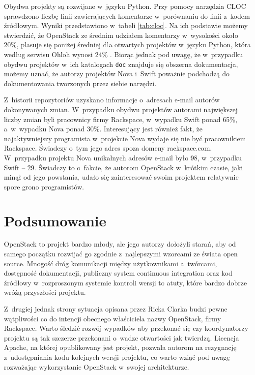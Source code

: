 	Obydwa projekty są rozwijane w~języku Python. Przy pomocy narzędzia CLOC
	\cite{cloc} sprawdzono liczbę linii zawierających komentarze w~porównaniu do
	linii z~kodem źródłowym. Wyniki przedstawiono w~tabeli \ref{tab:cloc}.
	Na ich podstawie możemy stwierdzić, że OpenStack ze średnim udziałem
	komentarzy w~wysokości około 20\%, plasuje się poniżej średniej dla
	otwartych projektów w~języku Python, która według serwisu Ohloh wynosi 24\%
	\cite{ohloh_python_stats}. Biorąc jednak pod uwagę, że w~przypadku obydwu
	projektów w~ich katalogach \texttt{doc} znajduje się obszerna dokumentacja,
	możemy uznać, że autorzy projektów Nova i~Swift poważnie podchodzą do
	dokumentowania tworzonych przez siebie narzędzi.

	Z~historii repozytoriów uzyskano informacje o~adresach e-mail autorów
	dokonywanych zmian. W~przypadku obydwu projektów autorami największej liczby
	zmian byli pracownicy firmy Rackspace, w~wypadku Swift ponad 65\%,
	a~w~wypadku Nova ponad 30\%. Interesujący jest również fakt, że
	najaktywniejszy programista w~projekcie Nova wydaje się nie być pracownikiem
	Rackspace. Świadczy o~tym jego adres spoza domeny rackspace.com.
	W~przypadku projektu Nova unikalnych adresów e-mail było 98, w~przypadku
	Swift -- 29. Świadczy to o~fakcie, że autorom OpenStack w~krótkim
	czasie, jaki minął od jego powstania, udało się zainteresować swoim
	projektem relatywnie spore grono programistów.

	\section{Podsumowanie}

	OpenStack to projekt bardzo młody, ale jego autorzy dołożyli starań, aby od
	samego początku rozwijać go zgodnie z~najlepszymi wzorcami ze świata open
	source. Mnogość dróg komunikacji między użytkownikami a~twórcami,
	dostępność dokumentacji, publiczny system continuous integration oraz kod
	źródłowy w~rozproszonym systemie kontroli wersji to atuty, które bardzo
	dobrze wróżą przyszłości projektu.

	Z~drugiej jednak strony sytuacja opisana przez Ricka Clarka budzi pewne
	wątpliwości co do intencji obecnego właściciela nazwy OpenStack, firmy
	Rackspace. Warto śledzić rozwój wypadków aby przekonać się czy koordynatorzy
	projektu są tak szczerze przekonani o~wadze otwartości jak twierdzą.
	Licencja Apache, na której opublikowany jest projekt, pozwala autorom na
	rezygnację z~udostępniania kodu kolejnych wersji projektu, co warto wziąć
	pod uwagę rozważając wykorzystanie OpenStack w~swojej architekturze.

	
	


